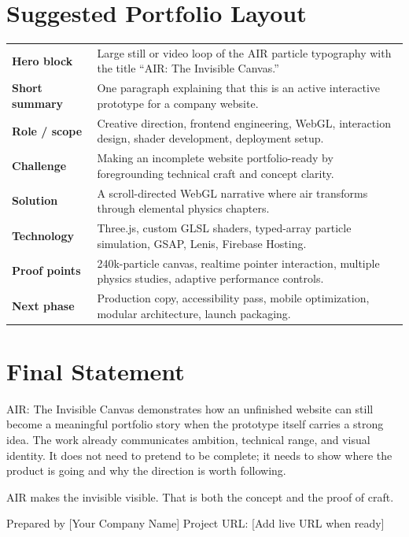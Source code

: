 \documentclass[11pt,a4paper]{article}
\newcommand{\CompanyName}{[Your Company Name]}
\newcommand{\ProjectName}{AIR: The Invisible Canvas}
\newcommand{\ProjectUrl}{[Add live URL when ready]}
\newcommand{\sectionrule}{\vspace{0.2em}{\color{AirLine}\hrule height 0.8pt}\vspace{0.8em}}
\begin{document}
\section*{Suggested Portfolio Layout}
\sectionrule

\begin{longtable}{>{\bfseries}p{} p{}}
Hero block & Large still or video loop of the AIR particle typography with the title ``AIR: The Invisible Canvas.'' \\
Short summary & One paragraph explaining that this is an active interactive prototype for a company website. \\
Role / scope & Creative direction, frontend engineering, WebGL, interaction design, shader development, deployment setup. \\
Challenge & Making an incomplete website portfolio-ready by foregrounding technical craft and concept clarity. \\
Solution & A scroll-directed WebGL narrative where air transforms through elemental physics chapters. \\
Technology & Three.js, custom GLSL shaders, typed-array particle simulation, GSAP, Lenis, Firebase Hosting. \\
Proof points & 240k-particle canvas, realtime pointer interaction, multiple physics studies, adaptive performance controls. \\
Next phase & Production copy, accessibility pass, mobile optimization, modular architecture, launch packaging. \\
\end{longtable}

\section*{Final Statement}
\sectionrule

\ProjectName{} demonstrates how an unfinished website can still become a meaningful portfolio story when the prototype itself carries a strong idea. The work already communicates ambition, technical range, and visual identity. It does not need to pretend to be complete; it needs to show where the product is going and why the direction is worth following.

AIR makes the invisible visible. That is both the concept and the proof of craft.

\vfill
{\small \textcolor{AirMuted}{Prepared by \CompanyName{} \textbullet{} Project URL: \ProjectUrl}}
\end{document}
